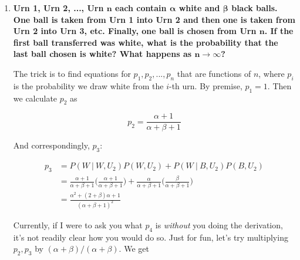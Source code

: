 \documentclass[10pt, oneside]{article}   	%
\theoremstyle{definition}
\begin{document}
\begin{enumerate}[label=3.\arabic*]
\begin{enumerate}
	\begin{proof}
	
	Consider $a_n = \frac{(2n)!}{((n!) 2^{n})^2}$ and $a_{n+1} = \frac{(2(n+1))!}{(((n+1)!) 2^{n+1})^2}$. Then:
	
	\begin{align*}
	\frac{a_{n+1}}{a_n} &= \frac{ (2(n+1))! }{ (((n+1)!) 2^{n+1})^2} \cdot \frac{((n!) 2^{n})^2}{(2n)!} \\
	&= \Bigg( \frac{1}{2(n+1)} \Bigg)^2 \cdot (2n+2)(2n+1) \\
	&= \frac{(2n+2)(2n+1)}{(2n+2)(2n+2)} < 1
	\end{align*}
	
	\end{proof}
	
	\end{enumerate}

\item  \begin{tcolorbox}[
  colback=Cerulean!5!white,
  colframe=Cerulean!75!black]
\textbf{Urn 1, Urn 2, ..., Urn $\bm{n}$ each contain $\bm{\alpha}$ white and $\bm{\beta}$ black balls. One ball is taken from Urn 1 into Urn 2 and then one is taken from Urn 2 into Urn 3, etc. Finally, one ball is chosen from Urn $\bm{n}$. If the first ball transferred was white, what is the probability that the last ball chosen is white? What happens as $\bm{n \rightarrow \infty}$?}
\end{tcolorbox}

The trick is to find equations for $p_1, p_2, ..., p_n$ that are functions of $n$, where $p_i$ is the probability we draw white from the $i$-th urn. By premise, $p_1 = 1$. Then we calculate $p_2$ as

\[ p_2 = \frac{\alpha + 1}{\alpha + \beta + 1} \]

And correspondingly, $p_3$:

\begin{align*}
p_3 &= P(W \ | \ W, U_2) P(W , U_2) + P (W \ | \ B, U_2) P(B, U_2) \\
&= \frac{\alpha + 1}{\alpha + \beta + 1} \bigg( \frac{\alpha+1}{\alpha + \beta + 1} \bigg) + \frac{\alpha}{\alpha + \beta + 1} \bigg( \frac{\beta}{\alpha + \beta + 1} \bigg) \\
&= \frac{\alpha^2 + (2 + \beta)\alpha + 1}{(\alpha + \beta + 1)^2}
\end{align*}

Currently, if I were to ask you what $p_4$ is \textit{without} you doing the derivation, it's not readily clear how you would do so. Just for fun, let's try multiplying $p_2, p_3$ by $(\alpha + \beta) / (\alpha + \beta)$. We get


\end{enumerate}
\end{document}
